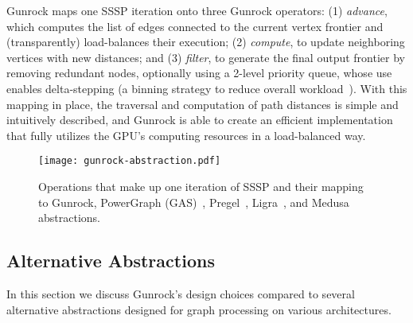 \documentclass[format=acmsmall,review=false,screen=true]{acmart}
\begin{document}
Gunrock maps one SSSP iteration onto three Gunrock operators: (1)
\emph{advance}, which computes the list of edges connected to the
current vertex frontier and (transparently) load-balances their
execution; (2) \emph{compute}, to update neighboring vertices with new
distances; and (3) \emph{filter}, to generate the final output
frontier by removing redundant nodes, optionally using a 2-level
priority queue, whose use enables delta-stepping (a binning strategy
to reduce overall workload~\cite{Davidson:2014:WPG,Meyer:2003:DAP}).
With this mapping in place, the traversal and computation of path
distances is simple and intuitively described, and Gunrock is able to
create an efficient implementation that fully utilizes the GPU's
computing resources in a load-balanced way.

\begin{figure*}
    \centering
    \texttt{[image: gunrock-abstraction.pdf]}
    \centering
    \caption{Operations that make up one iteration of SSSP and their
      mapping to Gunrock, PowerGraph
      (GAS)~\protect\cite{Gonzalez:2012:PDG},
      Pregel~\protect\cite{Malewicz:2010:PSL},
      Ligra~\protect\cite{Shun:2013:LAL}, and
      Medusa~\protect\cite{Zhong:2014:MSG} abstractions.}
    \label{fig:abstraction}
\end{figure*}

\subsection{Alternative Abstractions}
In this section we discuss Gunrock's design choices compared to
several alternative abstractions designed for graph processing on
various architectures.
\end{document}
